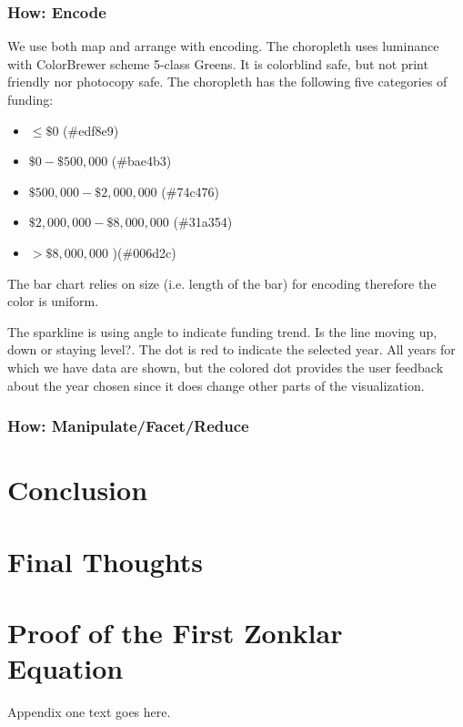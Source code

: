 \documentclass[10pt,journal,compsoc]{IEEEtran}
\begin{document}
\subsubsection{How: Encode}

We use both map and arrange with encoding. The choropleth uses luminance with ColorBrewer scheme 5-class Greens\cite{colorbrewer}. It is colorblind safe, but not print friendly nor photocopy safe. The choropleth has the following five categories of funding:

\begin{itemize}
\item $\le \$0$ (\#edf8e9)
\item $\$0 - \$500,000$ (\#bae4b3)
\item $\$500,000 - \$2,000,000$ (\#74c476)
\item $\$2,000,000 - \$8,000,000$ (\#31a354)
\item $> \$8,000,000$ )(\#006d2c)
\end{itemize}

The bar chart relies on size (i.e. length of the bar) for encoding therefore the color is uniform.

The sparkline is using angle to indicate funding trend. Is the line moving up, down or staying level?. The dot is red to indicate the selected year. All years for which we have data are shown, but the colored dot provides the user feedback about the year chosen since it does change other parts of the visualization.

\subsubsection{How: Manipulate/Facet/Reduce}


\section{Conclusion}


\section{Final Thoughts}


\appendices
\section{Proof of the First Zonklar Equation}
Appendix one text goes here.

\end{document}
